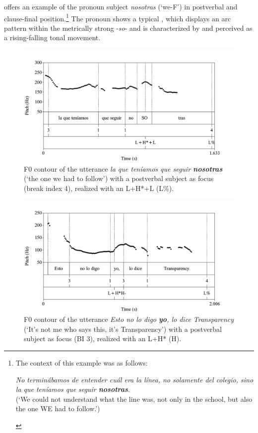 \documentclass[output=paper]{langsci/langscibook}
\begin{document}
 offers an example of the pronoun subject \textit{nosotras} (‘we-F’) in postverbal and clause-final position.\footnote{The context of this example was as follows:

\begin{exe}
\textit{No terminábamos de entender cuál era la línea, no solamente del colegio, sino la que teníamos que seguir \textbf{nosotras}}.\\
(‘We could not understand what the line was, not only in the school, but also the one WE had to follow.’)
\end{exe}\vspace*{-\baselineskip}} 
The pronoun shows a typical , which displays an arc pattern within the metrically strong  -\textit{so}- and is characterized by and perceived as a rising-falling tonal movement.


\begin{figure}[p]
\includegraphics[width=\textwidth]{figures/pes-img8.png}
\caption{F0 contour of the utterance \textit{la que teníamos que seguir \textbf{nosotras}} (‘the one we had to follow’) with a postverbal subject as focus (break index 4), realized with an L+H*+L (L\%).\label{fig:pes:8}}
\end{figure}

\begin{figure}[p]
\includegraphics[width=\textwidth]{figures/pes-img9.png}
\caption{F0 contour of the utterance \textit{Esto no lo digo \textbf{yo}, lo dice Transparency} (‘It’s not me who says this, it’s Transparency’) with a postverbal subject as focus (BI 3), realized with an L+H* (H\textminus{}).\label{fig:pes:9}}
\end{figure}%
\end{document}
